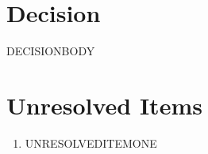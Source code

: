 \documentclass[11pt]{article}
\begin{document}
\section*{Decision}
DECISIONBODY
\section*{Unresolved Items}
\begin{enumerate}
\item UNRESOLVEDITEMONE
\end{enumerate}
\end{document}
